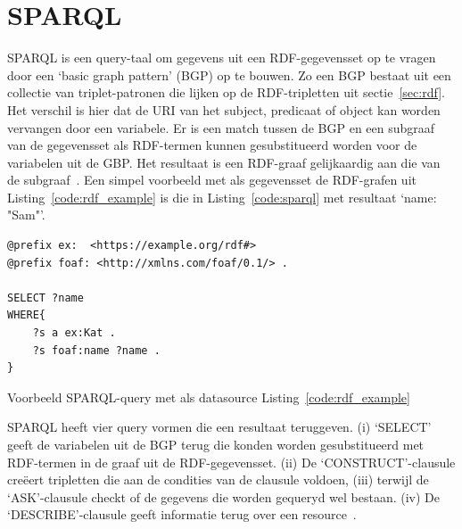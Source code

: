 \section{SPARQL}
SPARQL is een query-taal om gegevens uit een RDF-gegevensset op te vragen door een `basic graph pattern' (BGP) op te bouwen. Zo een BGP bestaat uit een collectie van triplet-patronen die lijken op de RDF-tripletten uit sectie~\ref{sec:rdf}. Het verschil is hier dat de URI van het subject, predicaat of object kan worden vervangen door een variabele. Er is een match tussen de BGP en een subgraaf van de gegevensset als RDF-termen kunnen gesubstitueerd worden voor de variabelen uit de GBP. Het resultaat is een RDF-graaf gelijkaardig aan die van de subgraaf~\cite{sparql}. Een simpel voorbeeld met als gegevensset de RDF-grafen uit Listing~\ref{code:rdf_example} is die  in Listing~\ref{code:sparql} met resultaat `name: "Sam"'.

\begin{code}
\begin{verbatim}
@prefix ex:  <https://example.org/rdf#>
@prefix foaf: <http://xmlns.com/foaf/0.1/> .

SELECT ?name 
WHERE{
    ?s a ex:Kat .
    ?s foaf:name ?name .
}

\end{verbatim}
\caption{Voorbeeld SPARQL-query met als datasource Listing~\ref{code:rdf_example}}
\label{code:sparql}
\end{code}

SPARQL heeft vier query vormen die een resultaat teruggeven. (i) `SELECT' geeft de variabelen uit de BGP terug die konden worden gesubstitueerd met RDF-termen in de graaf uit de RDF-gegevensset. (ii) De `CONSTRUCT'-clausule creëert tripletten die aan de condities van de clausule voldoen, (iii) terwijl de `ASK'-clausule checkt of de gegevens die worden gequeryd wel bestaan. (iv) De `DESCRIBE'-clausule geeft informatie terug over een resource~\cite{verborgh_webfundamental}.

